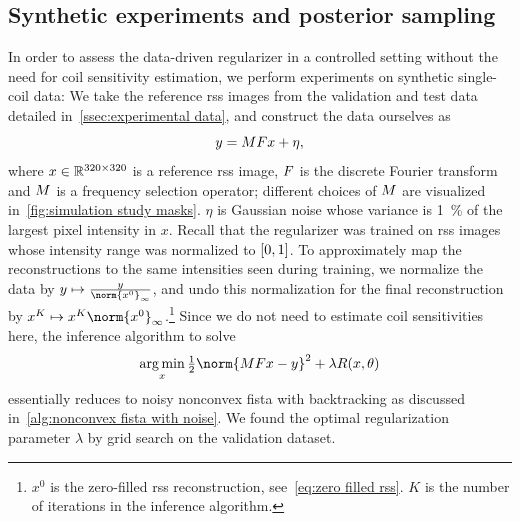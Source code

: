 \subsection{Synthetic experiments and posterior sampling}%
\label{ssec:details simulation study}
In order to assess the data-driven regularizer in a controlled setting without the need for coil sensitivity estimation, we perform experiments on synthetic single-coil data:
We take the reference \gls{rss} images from the validation and test data detailed in~\cref{ssec:experimental data}, and construct the data ourselves as
\begin{equation}
	y = MF x + \eta,
\end{equation}
where \( x \in \R^{\numproduct{320x320}} \) is a reference \gls{rss} image, \( F \) is the discrete Fourier transform and \( M \) is a frequency selection operator;
different choices of \( M \) are visualized in~\cref{fig:simulation study masks}.
\( \eta \) is Gaussian noise whose variance is \qty{1}{\percent} of the largest pixel intensity in \( x \).
Recall that the regularizer was trained on \gls{rss} images whose intensity range was normalized to \( \interval{\num{0}}{\num{1}} \).
To approximately map the reconstructions to the same intensities seen during training, we normalize the data by \( \Data \mapsto \frac{\Data}{\norm{x^{0}}_\infty} \), and undo this normalization for the final reconstruction by \( x^K \mapsto x^K\norm{x^{0}}_\infty \).\footnote{%
	\( x^{0} \) is the zero-filled \gls{rss} reconstruction, see~\cref{eq:zero filled rss}.
	\( K \) is the number of iterations in the inference algorithm.%
}
Since we do not need to estimate coil sensitivities here, the inference algorithm to solve
\begin{equation}
	\argmin_{x} \Half \norm{\Mask\Fourier x - \Data}^{\num{2}} + \lambda R(x, \theta)
	\label{eq:simulation study map}
\end{equation}
essentially reduces to noisy nonconvex \gls{fista} with backtracking as discussed in~\cref{alg:nonconvex fista with noise}.
We found the optimal regularization parameter \( \lambda \) by grid search on the validation dataset.

